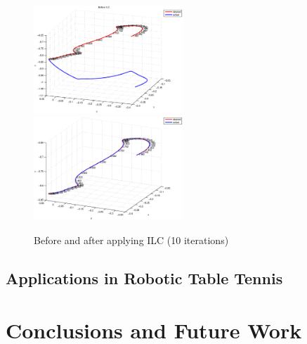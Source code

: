 \documentclass[10pt,a4paper]{article}
\begin{document}
\begin{figure}
\centering
\includegraphics[width=0.5\textwidth]{beforeILC.eps}%
\includegraphics[width=0.5\textwidth]{afterILCTLS.eps}		
\caption{Before and after applying ILC (10 iterations)}
\end{figure}
%

\subsection{Applications in Robotic Table Tennis}

\section{Conclusions and Future Work}\label{conclusions}



%
%

\end{document}
